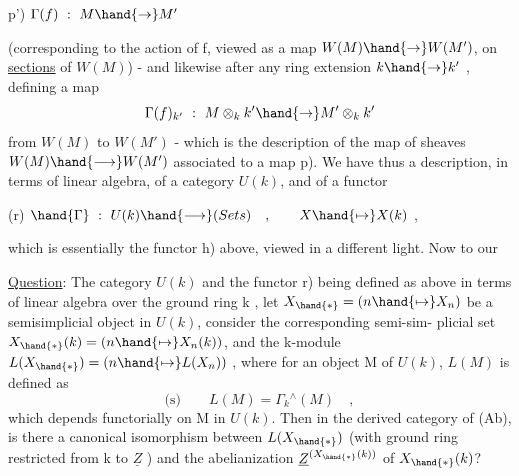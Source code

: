 
\hand{(}p') \qquad $\Gamma(f) \ : \ M \hand{\to} M'$

(corresponding to the action of f, viewed as a map $W(M)\hand{\to} W(M')$, on
\uline{sections} of $W(M)$) - and likewise after any ring extension $k\hand{\to} k'$ ,
defining a map
\[ \Gamma(f)_{k'} \ : \ M\otimes_k k' \hand{\to} M'\otimes_k k' \]
from $W(M)$ to $W(M')$ - which is the description of the map of sheaves
$W(M)\hand{\longrightarrow} W(M')$ associated to a map \hand{(}p). We have thus a description, in
terms of linear algebra, of a category $U(k)$, and of a  functor

(r) \qquad $\hand{\Gamma} \ : \ U(k) \hand{\longrightarrow} (Sets) \quad , \qquad X \hand{\mapsto} X(k)$ ,

which is essentially the functor \hand{(}h) above, viewed in a different light.
Now to our

\uline{Question}: \margin{\unsure{$\#$}}The category $U(k)$ and the functor r) being defined as above
in terms of linear algebra over the ground ring k , let $X_{\hand{*}} = (n\hand{\mapsto} X_n)$
be a semisimplicial object in $U(k)$, consider the corresponding semi-sim-%
plicial set $X_{\hand{*}}(k) = (n\hand{\mapsto} X_n(k))$, and the  k-module
$L(X_{\hand{*}}) = (n\hand{\mapsto} L(X_n))$ , where for an object M of $U(k)$, $L(M)$ is defined as
\[ \text{(s)} \qquad L(M) = \Gamma_k{}^{\wedge}(M) \quad , \]
which depends functorially on M in $U(k)$. Then in the derived category
of (Ab), is there a canonical isomorphism between $L(X_{\hand{*}})$ (with ground
ring restricted from k to $\underline{Z}$ ) and the abelianization $\underline{Z}^{(X_{\hand{*}}(k))}$ of $X_{\hand{*}}(k)$?

